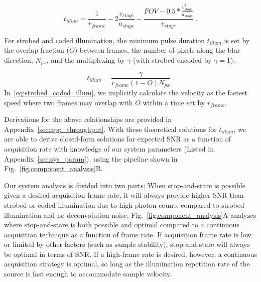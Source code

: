 \begin{equation}
\label{eq:sns_illum}
t_{illum} = \frac{1}{r_{frame}} - 2\frac{v_{stage}}{a_{stage}} - \frac{FOV - 0.5 * \frac{v_{stage}^2}{a_{stage}}}{v_{stage}}\:.
\end{equation}

For strobed and coded illumination, the minimum pulse duration $t_{illum}$ is set by the overlap fraction ($O$) between frames, the number of pixels along the blur direction, $N_{px}$, and the multiplexing by $\gamma$ (with strobed encoded by $\gamma=1$):

\begin{equation}
\label{eq:strobed_coded_illum}
t_{illum} = \frac{\gamma}{r_{frame}(1 - O) N_{px}}\:.
\end{equation}
In~\eqref{eq:strobed_coded_illum}, we implicitly calculate the velocity as the fastest speed where two frames may overlap with $O$ within a time set by $r_{frame}$.

Derivations for the above relationships are provided in Appendix~\ref{sec:app_throughput}. With these theoretical solutions for $t_{illum}$, we are able to derive closed-form solutions for expected SNR as a function of acquisition rate with knowledge of our system parameters (Listed in Appendix~\ref{sec:sys_param}), using the pipeline shown in Fig.~\ref{fig:component_analysis}B.

Our system analysis is divided into two parts; When stop-and-stare is possible given a desired acquisition frame rate, it will always provide higher SNR than strobed or coded illumination due to high photon counts compared to strobed illumination and no deconvolution noise. Fig.~\ref{fig:component_analysis}A analyzes where stop-and-stare is both possible and optimal compared to a continuous acquisition technique as a function of frame rate. If acquisition frame rate is low or limited by other factors (such as sample stability), stop-and-stare will always be optimal in terms of SNR. If a high-frame rate is desired, however, a continuous acquisition strategy is optimal, so long as the illumination repetition rate of the source is fast enough to accommodate sample velocity.

